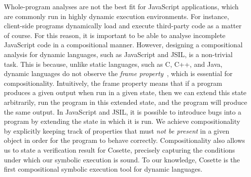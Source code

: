 \documentclass[sigconf, anonymous, review]{acmart}
\newcommand{\jsil}{JSIL\xspace}
\newcommand{\cosette}{Cosette\xspace}
\newcommand{\myparagraph}[1]{\smallskip\noindent {\bf #1.}\hspace{1pt}}
\begin{document}
\myparagraph{Novelty: Compositionality} 
Whole-program analyses are not the best fit for JavaScript applications, which are commonly run in highly dynamic execution environments. For instance, client-side programs dynamically load and execute third-party code as a matter of course. For this reason, it is important to be able to analyse incomplete JavaScript code in a compositional manner.
However, designing a compositional analysis for dynamic languages, such as JavaScript and \jsil, is a non-trivial task. This is because, unlike static languages, such as C, C++, and Java, dynamic languages do not observe the \emph{frame property}~\cite{?}, which is essential for compositionality. Intuitively,  the frame property means that if a program produces a given output when run in a given state, then we can extend this state arbitrarily, run the program in this extended state, and the program will produce the same output. In JavaScript and \jsil, it is possible to introduce bugs into a program by extending the state in which it is run. 
%
We achieve compositionality by explicitly keeping track of properties that must {\em not be present} in a given object in order for the program to behave correctly.
Compositionality also allows us to state a verification result for \cosette, precisely capturing the conditions under which our symbolic execution is sound.
To our knowledge, \cosette is the first compositional symbolic execution tool for dynamic languages.
%
%
%
%
%
%
\end{document}
